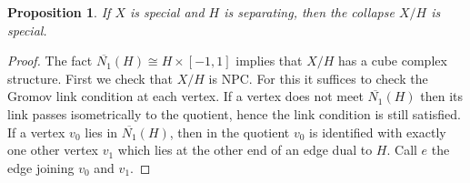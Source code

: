 \documentclass[11pt]{amsart}
\numberwithin{thm}{section}
\newtheorem{proposition}[thm]{Proposition}
\theoremstyle{remark}
\theoremstyle{definition}
\newcommand{\overl}[1]{\overline{#1}}
\begin{document}
\begin{proposition}\label{collapse} If $X$ is special and $H$ is separating, then the collapse $X/H$ is special. 

\end{proposition}
\begin{proof} 
%

The fact $\overl{N_1}(H)\cong H\times[-1,1]$ implies that $X/H$ has a cube complex structure.  First we check that $X/H$ is NPC.  For this it suffices to check the Gromov link condition at each vertex.  If a vertex does not meet $\overl{N_1}(H)$ then its link passes isometrically to the quotient, hence the link condition is still satisfied.  If a vertex $v_0$ lies in $\overl{N_1}(H)$, then in the quotient $v_0$ is identified with exactly one other vertex $v_1$ which lies at the other end of an edge dual to $H$. Call $e$ the edge joining $v_0$ and $v_1$.


\end{proof}
\end{document}
